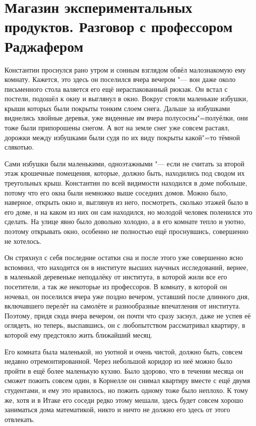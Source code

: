 \section[Магазин экспериментальных продуктов]
{Магазин экспериментальных продуктов. Разговор с профессором Раджафером}

Константин проснулся рано утром и сонным взглядом обвёл малознакомую ему комнату.
Кажется, это здесь он поселился вчера вечером "--- вон даже около письменного
стола валяется его ещё нераспакованный рюкзак.
Он встал с постели, подошёл к окну и выглянул в окно.
Вокруг стояли маленькие избушки, крыши которых были покрыты тонким слоем снега.
Дальше за избушками виднелись хвойные деревья, уже виденные им вчера
полусосны"=полуёлки, они тоже были припорошены снегом.
А вот на земле снег уже совсем растаял, дорожки между избушками были судя по их
виду покрыты какой"=то тёмной слякотью.

Сами избушки были маленькими, одноэтажными "--- если не считать за второй этаж
крошечные помещения, которые, должно быть, находились под сводом их треугольных
крыш.
Константин по всей видимости находился в доме побольше, потому что его окна были
немножко выше соседних домов.
Можно было, наверное, открыть окно и, выглянув из него, посмотреть, сколько
этажей было в его доме, и на каком из них он сам находился, но молодой человек
поленился это сделать.
На улице явно было довольно холодно, а в его комнате тепло и уютно, поэтому
открывать окно, особенно не полностью ещё проснувшись, совершенно не хотелось.

Он стряхнул с себя последние остатки сна и после этого уже совершенно ясно
вспомнил, что находится он в институте высших научных исследований, вернее, в
маленькой деревеньке неподалёку от института, в которой жили все его посетители,
а так же некоторые из профессоров.
В комнату, в которой он ночевал, он поселился вчера уже поздно вечером, уставший
после длинного дня, включавшего перелёт на самолёте и разнообразные впечатления
от института.
Поэтому, придя сюда вчера вечером, он почти что сразу заснул, даже не успев её
оглядеть, но теперь, выспавшись, он с любопытством рассматривал квартиру, в
которой ему предстояло жить ближайший месяц.

Его комната была маленькой, но уютной и очень чистой, должно быть, совсем
недавно отремонтированной.
Через небольшой коридор из неё можно было пройти в ещё более маленькую кухню.
Было здорово, что в течении месяца он сможет пожить совсем один, в Корнелле он
снимал квартиру вместе с ещё двумя студентами, и ему это нравилось, но пожить
одному тоже было неплохо.
К тому же, хотя и в Итаке его соседи редко этому мешали, здесь будет совсем
хорошо заниматься дома математикой, никто и ничто не должно его здесь от этого
отвлекать.

